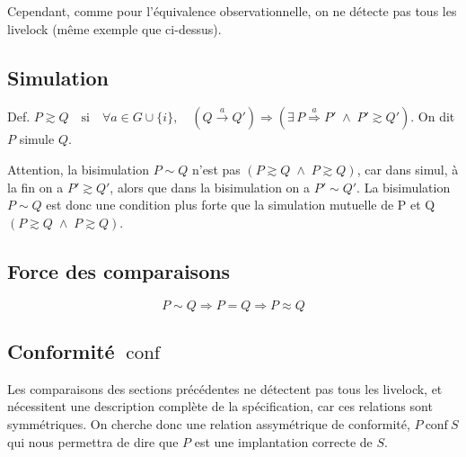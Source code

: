 \documentclass[a4paper,french,9pt]{article}
\def\GUi{G \cup \{i\}}
\def\transition#1{\stackrel{#1}{\longrightarrow}}
\def\Transition#1{\stackrel{#1}{\Longrightarrow}}
\def\forte{\sim}
\def\observationnelle{\approx}
\def\conf{\ \text{conf}\ }
\def\si{\quad\text{si}\quad}
\let\simule\gtrsim
\let\estsimulepar\gtrsim
\begin{document}
Cependant, comme pour l'équivalence observationnelle, on ne détecte pas tous les livelock (même exemple que ci-dessus).


\subsection{Simulation}

Def. $P \simule Q \si \forall a \in \GUi,\quad \left(Q\transition{a}Q'\right) \Rightarrow \left(\exists\, P\Transition{a}P' \;\wedge\; P'
  \simule Q'\right)$. On dit \og $P$ simule $Q$\fg.

Attention, la bisimulation $P \forte Q$ n'est pas $\left(P \simule Q \;\wedge\; P \estsimulepar Q\right)$, car dans simul, à la fin on a $P'
\simule Q'$, alors que dans la bisimulation on a $P' \forte Q'$. La bisimulation $P \forte Q$ est donc une condition plus forte que la
simulation mutuelle de P et Q $\left(P \simule Q \;\wedge\; P \estsimulepar Q\right)$.

\subsection{Force des comparaisons}

$$ P \forte Q \Rightarrow P = Q \Rightarrow P \observationnelle Q $$

\clearpage
\subsection{Conformité $\conf$}

Les comparaisons des sections précédentes ne détectent pas tous les livelock, et nécessitent une description complète de la spécification,
car ces relations sont symmétriques. On cherche donc une relation assymétrique de conformité, $P\conf S$ qui nous permettra de dire que $P$
est une implantation correcte de $S$.
\end{document}
